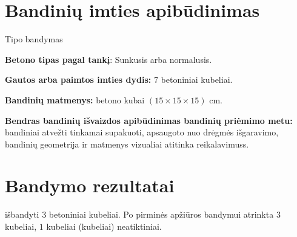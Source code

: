 \documentclass[a4paper, 12pt]{article}
\begin{document}
\section{Bandinių imties apibūdinimas}

\hspace{\parindent}{\bf Bandymo tipas pagal LST EN 206-1 8.2.1.2 ir/arba 8.2.1.3 pastraipas:} {Tipo bandymas }

{\bf Betono tipas pagal tankį}: {Sunkusis arba normalusis}.%

{\bf Gautos arba paimtos imties dydis:} $ 7 $ betoniniai kubeliai. 
	
	{\bf Bandinių matmenys:} betono kubai { $ (15 \times 15 \times 15) $} cm.
	
	{\bf Bendras bandinių išvaizdos apibūdinimas bandinių priėmimo metu:} bandiniai atvežti tinkamai supakuoti, apsaugoto nuo drėgmės išgaravimo, bandinių geometrija ir matmenys vizualiai atitinka reikalavimuss. %


\section{Bandymo rezultatai}

\hspace{\parindent}{\bf Imties dydis:} išbandyti $ 3 $ betoniniai kubeliai.
Po pirminės apžiūros bandymui atrinkta $ 3 $ kubeliai,
$ 1 $ kubeliai (kubeliai) neatiktiniai. %
\end{document}
